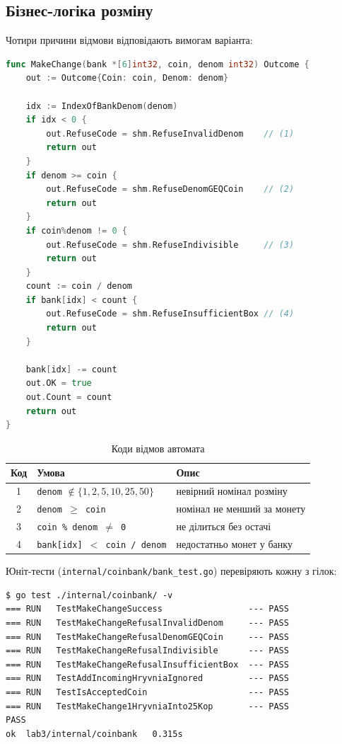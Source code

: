 \documentclass[a4paper,12pt]{article}
\newcommand{\dstutablerules}{%
  \setlength{\tabcolsep}{5pt}%
  \renewcommand{\arraystretch}{1.2}%
}
\begin{document}
\subsection{Бізнес-логіка розміну}

Чотири причини відмови відповідають вимогам варіанта:

\begin{lstlisting}[language=Go,caption={\texttt{internal/coinbank/bank.go} --- логіка розміну}]
func MakeChange(bank *[6]int32, coin, denom int32) Outcome {
    out := Outcome{Coin: coin, Denom: denom}

    idx := IndexOfBankDenom(denom)
    if idx < 0 {
        out.RefuseCode = shm.RefuseInvalidDenom    // (1)
        return out
    }
    if denom >= coin {
        out.RefuseCode = shm.RefuseDenomGEQCoin    // (2)
        return out
    }
    if coin%denom != 0 {
        out.RefuseCode = shm.RefuseIndivisible     // (3)
        return out
    }
    count := coin / denom
    if bank[idx] < count {
        out.RefuseCode = shm.RefuseInsufficientBox // (4)
        return out
    }

    bank[idx] -= count
    out.OK = true
    out.Count = count
    return out
}
\end{lstlisting}

\begin{table}[H]
\caption{Коди відмов автомата}
\dstutablerules
\begin{tabularx}{\linewidth}{@{}c l L@{}}
\toprule
Код & Умова & Опис \\
 & \texttt{denom} $\notin \{1,2,5,10,25,50\}$ & невірний номінал розміну \\
2 & \texttt{denom $\ge$ coin}                  & номінал не менший за монету \\
3 & \texttt{coin \% denom $\ne$ 0}             & не ділиться без остачі \\
4 & \texttt{bank[idx] $<$ coin / denom}        & недостатньо монет у банку \\
\bottomrule
\end{tabularx}
\end{table}

Юніт-тести (\texttt{internal/coinbank/bank\_test.go}) перевіряють кожну
з гілок:

\begin{lstlisting}[basicstyle=\ttfamily\scriptsize]
$ go test ./internal/coinbank/ -v
=== RUN   TestMakeChangeSuccess                 --- PASS
=== RUN   TestMakeChangeRefusalInvalidDenom     --- PASS
=== RUN   TestMakeChangeRefusalDenomGEQCoin     --- PASS
=== RUN   TestMakeChangeRefusalIndivisible      --- PASS
=== RUN   TestMakeChangeRefusalInsufficientBox  --- PASS
=== RUN   TestAddIncomingHryvniaIgnored         --- PASS
=== RUN   TestIsAcceptedCoin                    --- PASS
=== RUN   TestMakeChange1HryvniaInto25Kop       --- PASS
PASS
ok  lab3/internal/coinbank   0.315s
\end{lstlisting}
\end{document}
